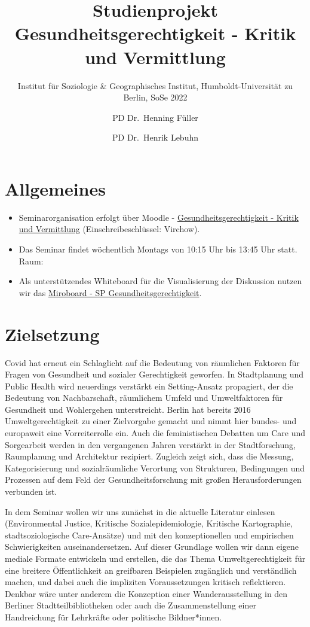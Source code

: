 \documentclass[
  ngerman,
]{article}
\title{Studienprojekt Gesundheitsgerechtigkeit - Kritik und Vermittlung}
\subtitle{Institut für Soziologie \& Geographisches Institut, Humboldt-Universität zu Berlin, SoSe 2022}
\author{PD Dr.~Henning Füller \and PD Dr.~Henrik Lebuhn}
\date{}
\begin{document}
\maketitle

{
\hypersetup{linkcolor=}
\setcounter{tocdepth}{2}
\tableofcontents
}
\newpage

\hypertarget{allgemeines}{%
\section*{Allgemeines}\label{allgemeines}}

\begin{itemize}
\item
  Seminarorganisation erfolgt über Moodle - \href{https://moodle.hu-berlin.de/course/view.php?id=110268}{Gesundheitsgerechtigkeit - Kritik und Vermittlung} (Einschreibeschlüssel: Virchow).
\item
  Das Seminar findet wöchentlich Montags von 10:15 Uhr bis 13:45 Uhr statt. Raum:
\item
  Als unterstützendes Whiteboard für die Visualisierung der Diskussion nutzen wir das \href{https://miro.com/app/board/uXjVOF6MyAc=/?invite_link_id=891179698806}{Miroboard - SP Gesundheitsgerechtigkeit}.
\end{itemize}

\hypertarget{zielsetzung}{%
\section*{Zielsetzung}\label{zielsetzung}}

Covid hat erneut ein Schlaglicht auf die Bedeutung von räumlichen Faktoren für Fragen von Gesundheit und sozialer Gerechtigkeit geworfen. In Stadtplanung und Public Health wird neuerdings verstärkt ein Setting-Ansatz propagiert, der die Bedeutung von Nachbarschaft, räumlichem Umfeld und Umweltfaktoren für Gesundheit und Wohlergehen unterstreicht. Berlin hat bereits 2016 Umweltgerechtigkeit zu einer Zielvorgabe gemacht und nimmt hier bundes- und europaweit eine Vorreiterrolle ein. Auch die feministischen Debatten um Care und Sorgearbeit werden in den vergangenen Jahren verstärkt in der Stadtforschung, Raumplanung und Architektur rezipiert. Zugleich zeigt sich, dass die Messung, Kategorisierung und sozialräumliche Verortung von Strukturen, Bedingungen und Prozessen auf dem Feld der Gesundheitsforschung mit großen Herausforderungen verbunden ist.

In dem Seminar wollen wir uns zunächst in die aktuelle Literatur einlesen (Environmental Justice, Kritische Sozialepidemiologie, Kritische Kartographie, stadtsoziologische Care-Ansätze) und mit den konzeptionellen und empirischen Schwierigkeiten auseinandersetzen. Auf dieser Grundlage wollen wir dann eigene mediale Formate entwickeln und erstellen, die das Thema Umweltgerechtigkeit für eine breitere Öffentlichkeit an greifbaren Beispielen zugänglich und verständlich machen, und dabei auch die impliziten Voraussetzungen kritisch reflektieren. Denkbar wäre unter anderem die Konzeption einer Wanderausstellung in den Berliner Stadtteilbibliotheken oder auch die Zusammenstellung einer Handreichung für Lehrkräfte oder politische Bildner*innen.
\end{document}
